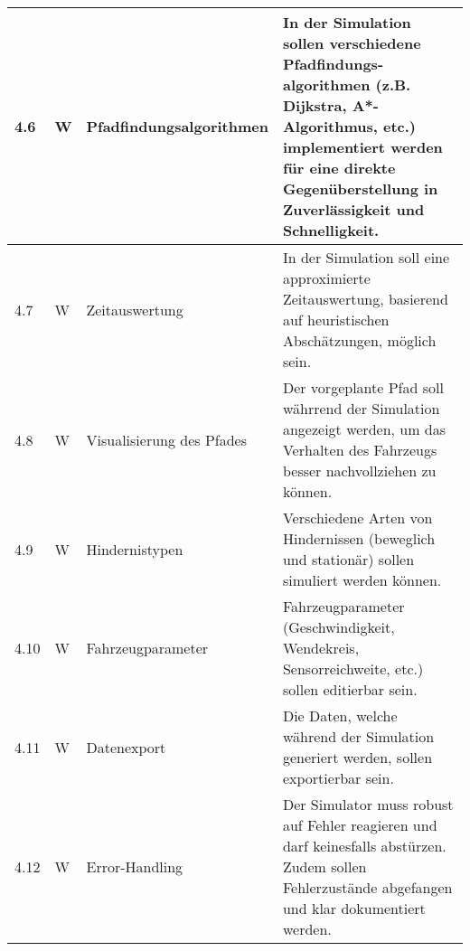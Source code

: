 \documentclass[main.tex]{subfiles} %
\begin{document}
\begin{tabular}{|l|p{0.5cm}|p{4cm}|p{10cm}|}
  \hline
  4.6          & W          & Pfadfindungsalgorithmen   & In der Simulation sollen verschiedene Pfadfindungs-algorithmen (z.B. Dijkstra, A*-Algorithmus, etc.) implementiert werden für eine direkte Gegenüberstellung in Zuverlässigkeit und Schnelligkeit. \\
  \hline
  4.7          & W          & Zeitauswertung            & In der Simulation soll eine approximierte Zeitauswertung, basierend auf heuristischen Abschätzungen, möglich sein.                                                                                 \\
  \hline
  4.8          & W          & Visualisierung des Pfades & Der vorgeplante Pfad soll währrend der Simulation angezeigt werden, um das Verhalten des Fahrzeugs besser nachvollziehen zu können.                                                                \\
  \hline
  4.9          & W          & Hindernistypen            & Verschiedene Arten von Hindernissen (beweglich und stationär) sollen simuliert werden können.                                                                                                      \\
  \hline
  4.10         & W          & Fahrzeugparameter         & Fahrzeugparameter (Geschwindigkeit, Wendekreis, Sensorreichweite, etc.) sollen editierbar sein.                                                                                                    \\
  \hline
  4.11         & W          & Datenexport               & Die Daten, welche während der Simulation generiert werden, sollen exportierbar sein.                                                                                                               \\
  \hline
  4.12         & W          & Error-Handling            & Der Simulator muss robust auf Fehler reagieren und darf keinesfalls abstürzen. Zudem sollen Fehlerzustände abgefangen und klar dokumentiert werden.                                                \\
  \hline
\end{tabular}
\end{document}
